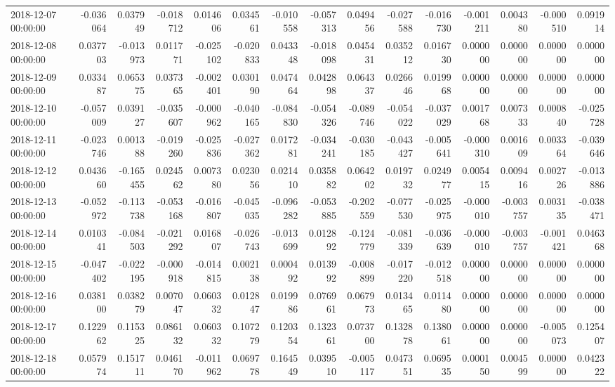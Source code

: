 \begin{tabular}{lrrrrrrrrrrrrrr}
2018-12-07 00:00:00 & -0.036064 & 0.037949 & -0.018712 & 0.014606 & 0.034561 & -0.010558 & -0.057313 & 0.049456 & -0.027588 & -0.016730 & -0.001211 & 0.004380 & -0.000510 & 0.091914 \\
2018-12-08 00:00:00 & 0.037703 & -0.013973 & 0.011771 & -0.025102 & -0.020833 & 0.043348 & -0.018098 & 0.045431 & 0.035212 & 0.016730 & 0.000000 & 0.000000 & 0.000000 & 0.000000 \\
2018-12-09 00:00:00 & 0.033487 & 0.065375 & 0.037365 & -0.002401 & 0.030190 & 0.047464 & 0.042898 & 0.064337 & 0.026646 & 0.019968 & 0.000000 & 0.000000 & 0.000000 & 0.000000 \\
2018-12-10 00:00:00 & -0.057009 & 0.039127 & -0.035607 & -0.000962 & -0.040165 & -0.084830 & -0.054326 & -0.089746 & -0.054022 & -0.037029 & 0.001768 & 0.007333 & 0.000840 & -0.025728 \\
2018-12-11 00:00:00 & -0.023746 & 0.001388 & -0.019260 & -0.025836 & -0.027362 & 0.017281 & -0.034241 & -0.030185 & -0.043427 & -0.005641 & -0.000310 & 0.001609 & 0.003364 & -0.039646 \\
2018-12-12 00:00:00 & 0.043660 & -0.165455 & 0.024562 & 0.007380 & 0.023056 & 0.021410 & 0.035882 & 0.064202 & 0.019732 & 0.024977 & 0.005415 & 0.009416 & 0.002726 & -0.013886 \\
2018-12-13 00:00:00 & -0.052972 & -0.113738 & -0.053168 & -0.016807 & -0.045035 & -0.096282 & -0.053885 & -0.202559 & -0.077530 & -0.025975 & -0.000010 & -0.003757 & 0.003135 & -0.038471 \\
2018-12-14 00:00:00 & 0.010341 & -0.084503 & -0.021292 & 0.016807 & -0.026743 & -0.013699 & 0.012892 & -0.124779 & -0.081339 & -0.036639 & -0.000010 & -0.003757 & -0.001421 & 0.046368 \\
2018-12-15 00:00:00 & -0.047402 & -0.022195 & -0.000918 & -0.014815 & 0.002138 & 0.000492 & 0.013992 & -0.008899 & -0.017220 & -0.012518 & 0.000000 & 0.000000 & 0.000000 & 0.000000 \\
2018-12-16 00:00:00 & 0.038100 & 0.038279 & 0.007047 & 0.060332 & 0.012847 & 0.019986 & 0.076961 & 0.067973 & 0.013465 & 0.011480 & 0.000000 & 0.000000 & 0.000000 & 0.000000 \\
2018-12-17 00:00:00 & 0.122962 & 0.115325 & 0.086132 & 0.060332 & 0.107279 & 0.120354 & 0.132361 & 0.073700 & 0.132878 & 0.138061 & 0.000000 & 0.000000 & -0.005073 & 0.125407 \\
2018-12-18 00:00:00 & 0.057974 & 0.151711 & 0.046170 & -0.011962 & 0.069778 & 0.164549 & 0.039510 & -0.005117 & 0.047351 & 0.069535 & 0.000150 & 0.004599 & 0.000000 & 0.042322 \\

\end{tabular}
